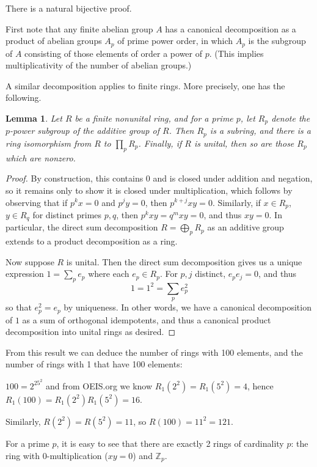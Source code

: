 \documentclass{amsart}
\newtheorem{lemma}[theorem]{Lemma}
\begin{document}
There is a natural bijective proof.

First note that any finite abelian group $A$ has a canonical
decomposition as a product of abelian groups $A_p$ of prime power order,
in which $A_p$ is the subgroup of $A$ consisting of those elements of order
a power of $p$.  (This implies multiplicativity of the number of abelian
groups.)

A similar decomposition applies to finite rings. More precisely, one has the following.

\begin{lemma}  Let $R$ be a finite nonunital ring, and for a prime $p$, let $R_p$
denote the $p$-power subgroup of the additive group of $R$.  Then $R_p$ is a
subring, and there is a ring isomorphism from $R$ to $\prod_p R_p$.  Finally,
if $R$ is unital, then so are those $R_p$ which are nonzero.
\end{lemma}

\begin{proof}
By construction, this contains $0$ and is closed under addition
and negation, so it remains only to show it is closed under
multiplication, which follows by observing that if $p^k x = 0$ and $p^j y =
0$, 
then $p^{k+j} xy = 0$.  Similarly, if $x \in R_p$, $y \in R_q$ for distinct
primes $p,q$, then $p^k xy = q^m xy = 0$, and thus $xy = 0$.  In particular, the
direct sum decomposition $R = \bigoplus_p R_p$ as an additive group extends
to a product decomposition as a ring.

Now suppose $R$ is unital.  Then the direct sum decomposition gives us a unique expression $1 = \sum_p e_p$
where each $e_p \in R_p$.  For $p,j$ distinct, $e_p e_j = 0$, and thus
$$1 = 1^2 = \sum_p e_p^2$$
so that $e_p^2 = e_p$ by uniqueness.  In other words, we have a canonical
decomposition of $1$ as a sum of orthogonal idempotents, and thus a
canonical product decomposition into unital rings as desired.
\end{proof}

From this result we can deduce the number of rings with 100 elements, and the number of rings with 1 that have 100 elements:

$100=2^25^2$ and from OEIS.org we know $R_1(2^2)=R_1(5^2)=4$, hence $R_1(100)=R_1(2^2)R_1(5^2)=16$.

Similarly,  $R(2^2)=R(5^2)=11$, so $R(100)=11^2=121$.


For a prime $p$, it is easy to see that there are exactly 2 rings of cardinality $p$: the ring with $0$-multiplication ($xy=0$) and $\mathbb Z_p$.
\end{document}
